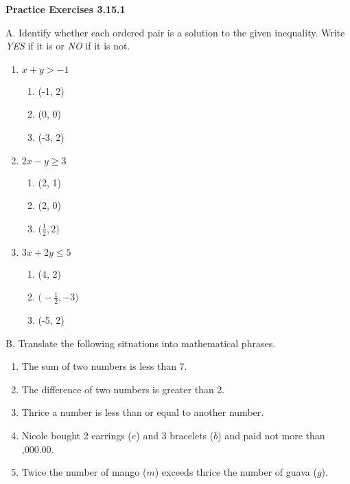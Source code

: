 \vspace{0.3ex}
\noindent  \textbf{Practice Exercises 3.15.1}

\vspace{0.2ex}

A. Identify whether each ordered pair is a solution to the given inequality. Write \emph{YES} if it is or \emph{NO} if it is not.


\begin{multicols}{3}
\begin{enumerate}%
\item $x+y > -1$
\begin{enumerate}%
\item (-1, 2)
\item (0, 0)
\item (-3, 2) 
\end{enumerate}   

\vfill
\columnbreak

\item $2x-y \geq 3$
\begin{enumerate}%
\item (2, 1)
\item (2, 0)
\item $\big(\displaystyle \frac{1}{2}, 2\big)$
\end{enumerate}  

\vfill
\columnbreak

\item $3x+2y \leq 5$
\begin{enumerate}%
\item (4, 2)
\item $\big(-\displaystyle \frac{1}{2}, -3\big)$
\item (-5, 2)
\end{enumerate}  
\end{enumerate}  
\end{multicols} 


B. Translate the following situations into mathematical phrases.
\begin{enumerate}%
\item The sum of two numbers is less than 7.
\item The difference of two numbers is greater than 2.
\item Thrice a number is less than or equal to another number.
\item Nicole bought 2 earrings ($e$) and 3 bracelets ($b$) and paid not more than ,000.00.
\item Twice the number of mango ($m$) exceeds thrice the number of guava ($g$).
\end{enumerate}  

